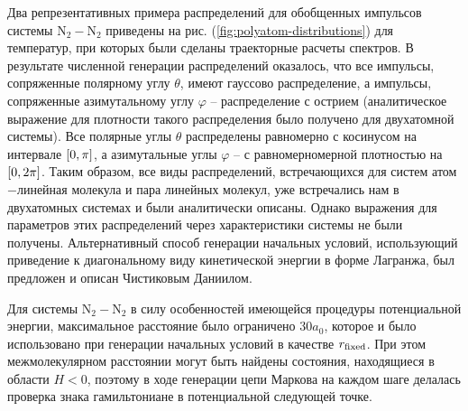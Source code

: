 Два репрезентативных примера распределений для обобщенных импульсов системы N$_2-$N$_2$  приведены на рис. (\ref{fig:polyatom-distributions}) для температур, при которых были сделаны траекторные расчеты спектров. В результате численной генерации распределений оказалось, что все импульсы, сопряженные полярному углу $\theta$, имеют гауссово распределение, а импульсы, сопряженные азимутальному углу $\varphi$ -- распределение с острием (аналитическое выражение для плотности такого распределения было получено для двухатомной системы). Все полярные углы $\theta$ распределены равномерно с косинусом на интервале $\left[ 0, \pi \right]$, а азимутальные углы $\varphi$ -- с равномерномерной плотностью на $\left[ 0, 2\pi \right]$. Таким образом, все виды распределений, встречающихся для систем атом$-$линейная молекула и пара линейных молекул, уже встречались нам в двухатомных системах и были аналитически описаны. Однако выражения для параметров этих распределений через характеристики системы не были получены. Альтернативный способ генерации начальных условий, использующий приведение к диагональному виду кинетической энергии в форме Лагранжа, был предложен и описан Чистиковым Даниилом. \par
Для системы N$_2-$N$_2$ в силу особенностей имеющейся процедуры потенциальной энергии, максимальное расстояние было ограничено $30 a_0$, которое и было использовано при генерации начальных условий в качестве $r_\text{fixed}$. При этом межмолекулярном расстоянии могут быть найдены состояния, находящиеся в области $H < 0$, поэтому в ходе генерации цепи Маркова на каждом шаге делалась проверка знака гамильтониане в потенциальной следующей точке. 
